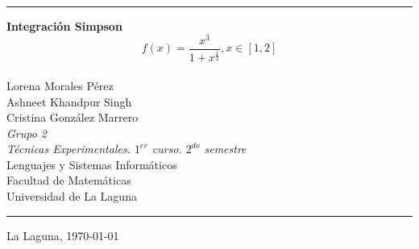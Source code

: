 \documentclass[spanish,a4paper,11pt]{report}
\begin{document}
\pagestyle{empty}
\thispagestyle{empty}

\newcommand{\HRule}{\rule{\linewidth}{1mm}}
\setlength{\parindent}{0mm}
\setlength{\parskip}{0mm}


\HRule
\begin{center}
        {\Huge \bf Integración Simpson} \\[2.5mm] 
        {\Huge \Large \[f(x) = \frac{x^3}{1+x^\frac{1}{2}}, x \in [1,2]\]} \\[2.5mm]
        {\Large Lorena Morales Pérez\\[2mm]
                Ashneet Khandpur Singh\\[2mm]
                Cristina González Marrero}\\[5mm]
        {\Large \textit{Grupo 2 }} \\[5mm]


        {\em Técnicas Experimentales. $1^{er}$ curso. $2^{do}$ semestre} \\[5mm]
        Lenguajes y Sistemas Informáticos \\[5mm]
        Facultad de Matemáticas \\[5mm]
        
        Universidad de La Laguna \\
\end{center}
\HRule
{}
\begin{center}
  La Laguna, \today 
\end{center}


\newpage

\begin{abstract}

\parindent=1cm Sabemos que una integral definida se define geométricamente como el área bajo la curva f(x) en el intervalo[a,b].
Desafortunadamente en la mayoría de los casos prácticos es muy difícil hallar una antiderivada de f(x). En estos casos el valor
de la integral debe aproximarse. Existen varias maneras para ello, por modelos ó métodos numéricos, aplicar la regla Trapezoidal 
o Rectangular con segmentos cada vez más pequeños o bien, utilizar las Reglas de SIMPSON aplicando polinomios de orden superior
para conectar los puntos, con la cual se obtiene una estimación más exacta de una integral. Por ejemplo si hay un punto medio 
extra entre f(a) y f(b), entonces se puede conectar los tres puntos con una parábola. Dicho de otra manera, para cada aplicación 
de la regla de SIMPSON se requieren dos subintervalos, a fin de aplicarla N número de veces, deberá dividirse el intervalo 
(a,b) en un número de subintervalos o segmentos. Cada subintervalo sucesivo se aproxima por un polinomio de segundo grado 
(parábola) y se integra de tal manera que la suma de las áreas de cada segmento de la parábola sea la aproximación a la 
integración deseada, como veremos a lo largo del proyecto.

\end{abstract}
\end{document}
